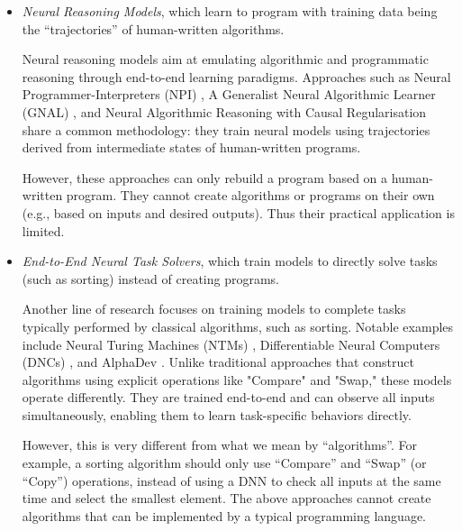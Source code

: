 \documentclass[pdflatex,sn-mathphys-num]{sn-jnl}%
\theoremstyle{thmstyleone}%
\theoremstyle{thmstyletwo}%
\theoremstyle{thmstylethree}%
\begin{document}
\begin{itemize}
    \item \emph{Neural Reasoning Models}, which learn to program with training data being the ``trajectories'' of human-written algorithms. 
    
      \par Neural reasoning models aim at emulating algorithmic and programmatic reasoning through end-to-end learning paradigms. Approaches such as Neural Programmer-Interpreters (NPI) \cite{reed2015neural}, A Generalist Neural Algorithmic Learner (GNAL) \cite{velivckovic2021neural}, and Neural Algorithmic Reasoning with Causal Regularisation \cite{zhang2022causal} share a common methodology: they train neural models using trajectories derived from intermediate states of human-written programs. 
      
      \par However, these approaches can only rebuild a program based on a human-written program. They cannot create algorithms or programs on their own (e.g., based on inputs and desired outputs). Thus their practical application is limited.

    \item \emph{End-to-End Neural Task Solvers}, which train models to directly solve tasks (such as sorting) instead of creating programs.

      \par Another line of research focuses on training models to complete tasks typically performed by classical algorithms, such as sorting. Notable examples include Neural Turing Machines (NTMs) \cite{graves2014neural}, Differentiable Neural Computers (DNCs) \cite{graves2016hybrid}, and AlphaDev \cite{alphadev2023}. Unlike traditional approaches that construct algorithms using explicit operations like "Compare" and "Swap," these models operate differently. They are trained end-to-end and can observe all inputs simultaneously, enabling them to learn task-specific behaviors directly.

      \par However, this is very different from what we mean by ``algorithms''. For example, a sorting algorithm should only use ``Compare'' and ``Swap'' (or ``Copy'') operations, instead of using a DNN to check all inputs at the same time and select the smallest element. The above approaches cannot create algorithms that can be implemented by a typical programming language.

\end{itemize}
\end{document}
